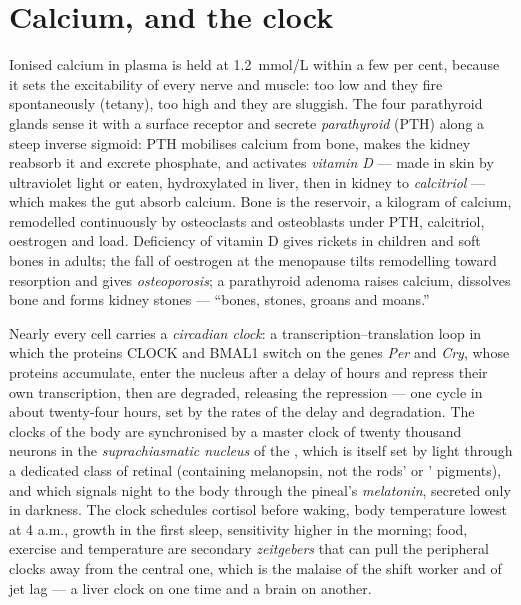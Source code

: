 \section{Calcium, and the clock}

\begin{definition}\label{def:b3:endocrinology:calcium}
Ionised calcium in plasma is held at \qty{1.2}{mmol/L} within a few per
cent, because it sets the excitability of every nerve and muscle: too
low and they fire spontaneously (tetany), too high and they are
sluggish. The four parathyroid glands sense it with a surface receptor
and secrete \emph{parathyroid } (PTH) along a steep inverse
sigmoid: PTH mobilises calcium from bone, makes the kidney reabsorb it
and excrete phosphate, and activates \emph{vitamin D} --- made in skin
by ultraviolet light or eaten, hydroxylated in liver, then in kidney
to \emph{calcitriol} --- which makes the gut absorb calcium. Bone is
the reservoir, a kilogram of calcium, remodelled continuously by
osteoclasts and osteoblasts under PTH, calcitriol, oestrogen and load.
Deficiency of vitamin D gives rickets in children and soft bones in
adults; the fall of oestrogen at the menopause tilts remodelling toward
resorption and gives \emph{osteoporosis}; a parathyroid adenoma raises
calcium, dissolves bone and forms kidney stones --- ``bones, stones,
groans and moans.''
\end{definition}

\begin{definition}\label{def:b3:endocrinology:clock}
Nearly every cell carries a \emph{circadian clock}: a
transcription--translation loop in which the proteins CLOCK and BMAL1
switch on the genes \emph{Per} and \emph{Cry}, whose proteins
accumulate, enter the nucleus after a delay of hours and repress their
own transcription, then are degraded, releasing the repression --- one
cycle in about twenty-four hours, set by the rates of the delay and
degradation. The clocks of the body are synchronised by a master clock
of twenty thousand neurons in the \emph{suprachiasmatic nucleus} of the
, which is itself set by light through a dedicated class
of retinal  (containing melanopsin, not the rods' or
' pigments), and which signals night to the body through the
pineal's \emph{melatonin}, secreted only in darkness. The clock
schedules cortisol before waking, body temperature lowest at 4 a.m.,
growth  in the first sleep,  sensitivity higher in the
morning; food, exercise and temperature are secondary
\emph{zeitgebers} that can pull the peripheral clocks away from the
central one, which is the malaise of the shift worker and of jet lag ---
a liver clock on one time and a brain on another.
\end{definition}

